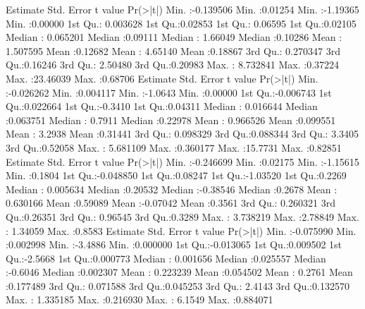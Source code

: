 \documentclass{article}
\begin{document}
\newpage
    Estimate           Std. Error         t value            Pr(>|t|)      
 Min.   :-0.139506   Min.   :0.01254   Min.   :-1.19365   Min.   :0.00000  
 1st Qu.: 0.003628   1st Qu.:0.02853   1st Qu.: 0.06595   1st Qu.:0.02105  
 Median : 0.065201   Median :0.09111   Median : 1.66049   Median :0.10286  
 Mean   : 1.507595   Mean   :0.12682   Mean   : 4.65140   Mean   :0.18867  
 3rd Qu.: 0.270347   3rd Qu.:0.16246   3rd Qu.: 2.50480   3rd Qu.:0.20983  
 Max.   : 8.732841   Max.   :0.37224   Max.   :23.46039   Max.   :0.68706  
\newpage
    Estimate           Std. Error          t value           Pr(>|t|)      
 Min.   :-0.026262   Min.   :0.004117   Min.   :-1.0643   Min.   :0.00000  
 1st Qu.:-0.006743   1st Qu.:0.022664   1st Qu.:-0.3410   1st Qu.:0.04311  
 Median : 0.016644   Median :0.063751   Median : 0.7911   Median :0.22978  
 Mean   : 0.966526   Mean   :0.099551   Mean   : 3.2938   Mean   :0.31441  
 3rd Qu.: 0.098329   3rd Qu.:0.088344   3rd Qu.: 3.3405   3rd Qu.:0.52058  
 Max.   : 5.681109   Max.   :0.360177   Max.   :15.7731   Max.   :0.82851  
\newpage
    Estimate           Std. Error         t value            Pr(>|t|)     
 Min.   :-0.246699   Min.   :0.02175   Min.   :-1.15615   Min.   :0.1804  
 1st Qu.:-0.048850   1st Qu.:0.08247   1st Qu.:-1.03520   1st Qu.:0.2269  
 Median : 0.005634   Median :0.20532   Median :-0.38546   Median :0.2678  
 Mean   : 0.630166   Mean   :0.59089   Mean   :-0.07042   Mean   :0.3561  
 3rd Qu.: 0.260321   3rd Qu.:0.26351   3rd Qu.: 0.96545   3rd Qu.:0.3289  
 Max.   : 3.738219   Max.   :2.78849   Max.   : 1.34059   Max.   :0.8583  
\newpage
    Estimate           Std. Error          t value           Pr(>|t|)       
 Min.   :-0.075990   Min.   :0.002998   Min.   :-3.4886   Min.   :0.000000  
 1st Qu.:-0.013065   1st Qu.:0.009502   1st Qu.:-2.5668   1st Qu.:0.000773  
 Median : 0.001656   Median :0.025557   Median :-0.6046   Median :0.002307  
 Mean   : 0.223239   Mean   :0.054502   Mean   : 0.2761   Mean   :0.177489  
 3rd Qu.: 0.071588   3rd Qu.:0.045253   3rd Qu.: 2.4143   3rd Qu.:0.132570  
 Max.   : 1.335185   Max.   :0.216930   Max.   : 6.1549   Max.   :0.884071  
\end{document}
